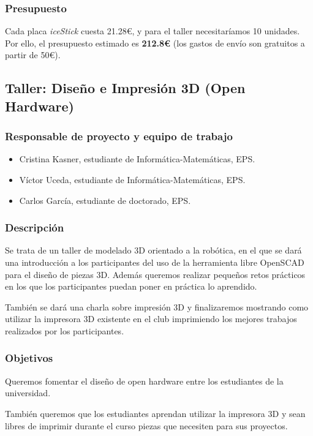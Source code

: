 \documentclass[12pt,twoside]{report}
\begin{document}
\subsubsection{Presupuesto}

Cada placa \emph{iceStick} cuesta 21.28\euro{}, y para el taller necesitaríamos 10 unidades. Por ello, el presupuesto estimado es \textbf{212.8\euro{}} (los gastos de envío son gratuitos a partir de 50\euro{}).






\subsection{Taller: Diseño e Impresión 3D (Open Hardware)}
\subsubsection{Responsable de proyecto y equipo de trabajo}

\begin{itemize}
\item Cristina Kasner, estudiante de Informática-Matemáticas, EPS.
\item Víctor Uceda, estudiante de Informática-Matemáticas, EPS.
\item Carlos García, estudiante de doctorado, EPS.
\end{itemize}

\subsubsection{Descripción}
Se trata de un taller de modelado 3D orientado a la robótica, en el que se dará una introducción a los participantes del uso de la herramienta libre OpenSCAD para el diseño de piezas 3D. Además queremos realizar pequeños retos prácticos en los que los participantes puedan poner en práctica lo aprendido.

También se dará una charla sobre impresión 3D y finalizaremos mostrando como utilizar la impresora 3D existente en el club imprimiendo los mejores trabajos realizados por los participantes.
\subsubsection{Objetivos}
Queremos fomentar el diseño de open hardware entre los estudiantes de la universidad.

También queremos que los estudiantes aprendan utilizar la impresora 3D y sean libres de imprimir durante el curso piezas que necesiten para sus proyectos.
\end{document}
